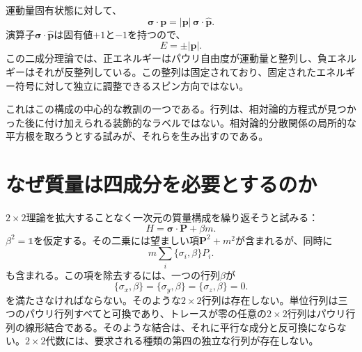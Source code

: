 運動量固有状態に対して、
\begin{equation}
\boldsymbol{\sigma}\cdot\mathbf p
=
|\mathbf p|\,\boldsymbol{\sigma}\cdot\widehat{\mathbf p}.
\end{equation}
演算子\(\boldsymbol{\sigma}\cdot\widehat{\mathbf p}\)は固有値\(+1\)と\(-1\)を持つので、
\begin{equation}
E=\pm|\mathbf p|.
\end{equation}
この二成分理論では、正エネルギーはパウリ自由度が運動量と整列し、負エネルギーはそれが反整列している。この整列は固定されており、固定されたエネルギー符号に対して独立に調整できるスピン方向ではない。

\begin{classroomqa}
\end{classroomqa}

これはこの構成の中心的な教訓の一つである。行列は、相対論的方程式が見つかった後に付け加えられる装飾的なラベルではない。相対論的分散関係の局所的な平方根を取ろうとする試みが、それらを生み出すのである。

\section{なぜ質量は四成分を必要とするのか}

\(2\times2\)理論を拡大することなく一次元の質量構成を繰り返そうと試みる：
\begin{equation}
H=\boldsymbol{\sigma}\cdot\mathbf P+\beta m.
\label{eq:l10-failed-mass}
\end{equation}
\(\beta^2=\mathbb{1}\)を仮定する。その二乗には望ましい項\(\mathbf P^2+m^2\)が含まれるが、同時に
\begin{equation}
m\sum_i\{\sigma_i,\beta\}P_i.
\end{equation}
も含まれる。この項を除去するには、一つの行列\(\beta\)が
\begin{equation}
\{\sigma_x,\beta\}
=
\{\sigma_y,\beta\}
=
\{\sigma_z,\beta\}
=0.
\label{eq:l10-impossible-beta}
\end{equation}
を満たさなければならない。そのような\(2\times2\)行列は存在しない。単位行列は三つのパウリ行列すべてと可換であり、トレースが零の任意の\(2\times2\)行列はパウリ行列の線形結合である。そのような結合は、それに平行な成分と反可換にならない。\(2\times2\)代数には、要求される種類の第四の独立な行列が存在しない。

